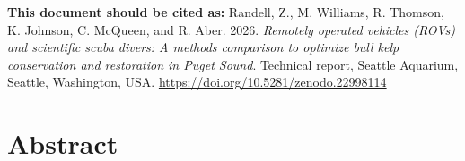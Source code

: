 \documentclass[11pt]{article}
\newcommand{\suggestedcitation}{%
\textbf{This document should be cited as:}
Randell, Z., M. Williams, R. Thomson, K. Johnson, C. McQueen, and R. Aber.
2026. \textit{Remotely operated vehicles (ROVs) and scientific scuba
divers: A methods comparison to optimize bull kelp conservation and
restoration in Puget Sound}. Technical report, Seattle Aquarium,
Seattle, Washington, USA.
\url{https://doi.org/10.5281/zenodo.22998114}
}
\begin{document}
\begin{titlepage}
		
		\begin{center}
			\begin{minipage}{0.9\textwidth}
				\small
				\noindent
				\suggestedcitation
			\end{minipage}
		\end{center}
		
		\vspace*{\fill}
		
	\end{titlepage}
	
	
	\tableofcontents

	\clearpage
	
	
	\setcounter{page}{1}

\section{Abstract}
\end{document}
